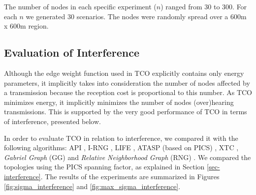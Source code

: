 \documentclass{llncs}
\begin{document}
The number of nodes in each specific experiment ($n$) ranged from 30 to 300. For each $n$ we generated 30 scenarios. The nodes were randomly spread over a 600m x 600m region. 

\subsection{Evaluation of Interference}
\label{subsec-evaluation_interference}

Although the edge weight function used in TCO explicitly contains only energy parameters,
it implicitly takes into consideration the number of nodes affected by a transmission because the reception cost is proportional to this number. As TCO minimizes energy, it implicitly minimizes the number of nodes (over)hearing transmissions.
This is supported by the very good performance of TCO in terms of interference, presented below.

In order to evaluate TCO in relation to interference, we compared it with the following algorithms: 
API \cite{johansson2005}, I-RNG \cite{Li05}, LIFE \cite{burkhart2004}, ATASP (based on PICS) \cite{blough2005}, XTC \cite{Wattenhofer2004}, \emph{Gabriel Graph} (GG) \cite{Santi2005c} and \emph{Relative Neighborhood Graph} (RNG) \cite{Santi2005c}. We compared the topologies using the PICS spanning factor, as explained in Section \ref{sec-interference}. 
The results of the experiments are summarized in Figures \ref{fig:sigma_interference} and \ref{fig:max_sigma_interference}.
\end{document}
